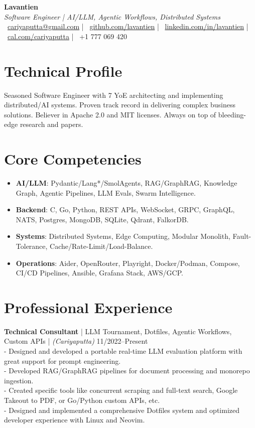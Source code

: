 \documentclass[10pt, a4paper]{article}
\begin{document}
\begin{center}
    \textbf{\LARGE Lavantien} \\
    \textit{Software Engineer | AI/LLM, Agentic Workflows, Distributed Systems} \\
    \vspace{2pt}
    \small
    \faEnvelope\ \href{mailto:cariyaputta@gmail.com}{cariyaputta@gmail.com} | 
    \faGithub\ \href{https://github.com/lavantien}{github.com/lavantien} |
    \faLinkedin\ \href{https://linkedin.com/in/lavantien}{linkedin.com/in/lavantien} |
    \faCalendar\ \href{https://cal.com/cariyaputta}{cal.com/cariyaputta} |
    \faPhone\ +1 777 069 420
\end{center}

\section*{Technical Profile}
Seasoned Software Engineer with 7 YoE architecting and implementing distributed/AI systems. Proven track record in delivering complex business solutions. Believer in Apache 2.0 and MIT licenses. Always on top of bleeding-edge research and papers.

\section*{Core Competencies}
\begin{itemize}[nosep,leftmargin=*]
    \item \textbf{AI/LLM}: Pydantic/Lang*/SmolAgents, RAG/GraphRAG, Knowledge Graph, Agentic Pipelines, LLM Evals, Swarm Intelligence.
    \item \textbf{Backend}: C, Go, Python, REST APIs, WebSocket, GRPC, GraphQL, NATS, Postgres, MongoDB, SQLite, Qdrant, FalkorDB.
    \item \textbf{Systems}: Distributed Systems, Edge Computing, Modular Monolith, Fault-Tolerance, Cache/Rate-Limit/Load-Balance.
    \item \textbf{Operations}: Aider, OpenRouter, Playright, Docker/Podman, Compose, CI/CD Pipelines, Ansible, Grafana Stack, AWS/GCP.
\end{itemize}

\section*{Professional Experience}
\textbf{Technical Consultant} | LLM Tournament, Dotfiles, Agentic Workflows, Custom APIs | \textit{(Cariyaputta)} \hfill 11/2022--Present \\
- Designed and developed a portable real-time LLM evaluation platform with great support for prompt engineering. \\
- Developed RAG/GraphRAG pipelines for document processing and monorepo ingestion. \\
- Created specific tools like concurrent scraping and full-text search, Google Takeout to PDF, or Go/Python custom APIs, etc. \\
- Designed and implemented a comprehensive Dotfiles system and optimized developer experience with Linux and Neovim.
\end{document}
